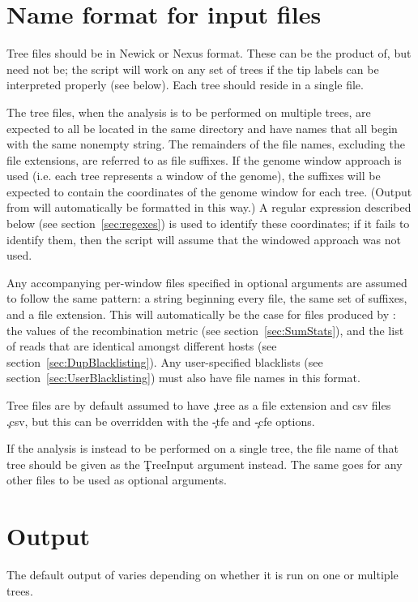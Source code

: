 \section{Name format for input files}

Tree files should be in Newick or Nexus format.
These can be the product of\break \pmt, but need not be; the script will work on any set of trees if the tip labels can be interpreted properly (see below).
Each tree should reside in a single file.

The tree files, when the analysis is to be performed on multiple trees, are expected to all be located in the same directory and have names that all begin with the same nonempty string.
The remainders of the file names, excluding the file extensions, are referred to as file suffixes.
If the genome window approach is used (i.e. each tree represents a window of the genome), the suffixes will be expected to contain the coordinates of the genome window for each tree.
(Output from \pmt will automatically be formatted in this way.) A regular expression described below (see section~\ref{sec:regexes}) is used to identify these coordinates; if it fails to identify them, then the script will assume that the windowed approach was not used.

Any accompanying per-window files specified in optional arguments are assumed to follow the same pattern: a string beginning every file, the same set of suffixes, and a file extension.
This will automatically be the case for files produced by \pmt: the values of the recombination metric (see section~\ref{sec:SumStats}), and the list of reads that are identical amongst different hosts (see section~\ref{sec:DupBlacklisting}).
Any user-specified blacklists (see section~\ref{sec:UserBlacklisting}) must also have file names in this format.

Tree files are by default assumed to have \c{.tree} as a file extension and csv files \c{.csv}, but this can be overridden with the \c{-tfe} and \c{-cfe} options.

If the analysis is instead to be performed on a single tree, the file name of that tree should be given as the \c{TreeInput} argument instead.
The same goes for any other files to be used as optional arguments.

\section{Output}

The default output of \pat varies depending on whether it is run on one or multiple trees.

